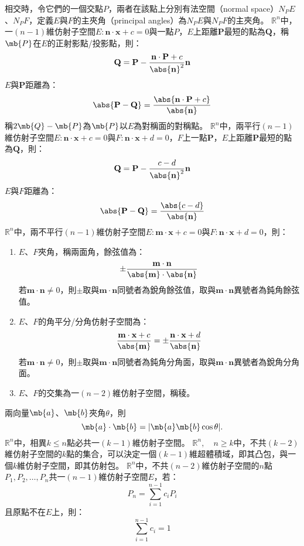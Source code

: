 \documentclass[a4paper,12pt]{report}
\begin{document}
相交時，令它們的一個交點$P$，兩者在該點上分別有法空間（normal space）$N_PE$、$N_PF$，定義$E$與$F$的主夾角（principal angles）為$N_PE$與$N_PF$的主夾角。
$\mathbb{R}^n$中，一$(n-1)$維仿射子空間$E\colon\mathbf{n}\cdot\mathbf{x}+c=0$與一點$P$，$E$上距離$\mathbf{P}$最短的點為$\mathbf{Q}$，稱$\mb{P}$在$E$的正射影點/投影點，則：
\[\mathbf{Q}=\mathbf{P}-\frac{\mathbf{n}\cdot\mathbf{P}+c}{\abs{\mathbf{n}}^2}\mathbf{n}\]
$E$與$\mathbf{P}$距離為：
\[\abs{\mathbf{P}-\mathbf{Q}}=\frac{\abs{\mathbf{n}\cdot\mathbf{P}+c}}{\abs{\mathbf{n}}}\]
稱$2\mb{Q}-\mb{P}$為$\mb{P}$以$E$為對稱面的對稱點。
$\mathbb{R}^n$中，兩平行$(n-1)$維仿射子空間$E\colon\mathbf{n}\cdot\mathbf{x}+c=0$與$F\colon\mathbf{n}\cdot\mathbf{x}+d=0$，$F$上一點$\mathbf{P}$，$E$上距離$\mathbf{P}$最短的點為$\mathbf{Q}$，則：
\[\mathbf{Q}=\mathbf{P}-\frac{c-d}{\abs{\mathbf{n}}^2}\mathbf{n}\]
$E$與$F$距離為：
\[\abs{\mathbf{P}-\mathbf{Q}}=\frac{\abs{c-d}}{\abs{\mathbf{n}}}\]
$\mathbb{R}^n$中，兩不平行$(n-1)$維仿射子空間$E\colon\mathbf{m}\cdot\mathbf{x}+c=0$與$F\colon\mathbf{n}\cdot\mathbf{x}+d=0$，則：
\begin{enumerate}
\item $E$、$F$夾角，稱兩面角，餘弦值為：
\[\pm\frac{\mathbf{m}\cdot\mathbf{n}}{\abs{\mathbf{m}}\cdot\abs{\mathbf{n}}}\]
若$\mathbf{m}\cdot\mathbf{n}\neq 0$，則$\pm$取與$\mathbf{m}\cdot\mathbf{n}$同號者為銳角餘弦值，取與$\mathbf{m}\cdot\mathbf{n}$異號者為鈍角餘弦值。
\item $E$、$F$的角平分/分角仿射子空間為：
\[\frac{\mathbf{m}\cdot\mathbf{x}+c}{\abs{\mathbf{m}}}=\pm\frac{\mathbf{n}\cdot\mathbf{x}+d}{\abs{\mathbf{n}}}\]
若$\mathbf{m}\cdot\mathbf{n}\neq 0$，則$\pm$取與$\mathbf{m}\cdot\mathbf{n}$同號者為鈍角分角面，取與$\mathbf{m}\cdot\mathbf{n}$異號者為銳角分角面。
\item $E$、$F$的交集為一$(n-2)$維仿射子空間，稱稜。
\end{enumerate}
兩向量$\mb{a}$、$\mb{b}$夾角$\theta$，則
\[\mb{a}\cdot\mb{b}=|\mb{a}\mb{b}\cos\theta|.\]
$\mathbb{R}^n$中，相異$k\leq n$點必共一$(k-1)$維仿射子空間。
$\mathbb{R}^n,\quad n\geq k$中，不共$(k-2)$維仿射子空間的$k$點的集合，可以決定一個$(k-1)$維超體積域，即其凸包，與一個$k$維仿射子空間，即其仿射包。
$\mathbb{R}^n$中，不共$(n-2)$維仿射子空間的$n$點$P_1,P_2,\ldots,P_n$共一$(n-1)$維仿射子空間$E$，若：
\[P_n=\sum_{i=1}^{n-1}c_iP_i\]
且原點不在$E$上，則：
\[\sum_{i=1}^{n-1}c_i=1\]
\end{document}
